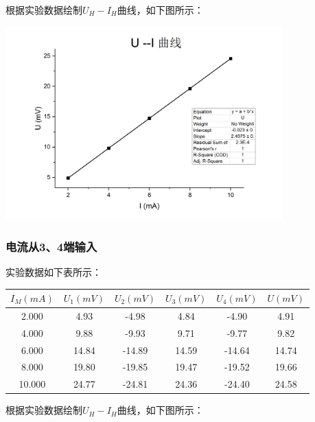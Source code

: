 \documentclass{article}
\begin{document}
    根据实验数据绘制$U_H-I_H$曲线，如下图所示：

    \begin{center}
        \includegraphics[width=0.8\textwidth]{U-I curve.jpg}
    \end{center}

    \subsubsection{电流从3、4端输入}

    实验数据如下表所示：

    \begin{center}
        \begin{tabular}{|c||c|c|c|c||c|}
            \hline
            $I_M(mA)$ & $U_1(mV)$ & $U_2(mV)$ & $U_3(mV)$ & $U_4(mV)$ & $U(mV)$ \\
            \hline
            2.000 & 4.93 & -4.98 & 4.84 & -4.90 & 4.91\\
            \hline
            4.000 & 9.88 & -9.93 & 9.71 & -9.77 & 9.82\\
            \hline
            6.000 & 14.84 & -14.89 & 14.59 & -14.64 & 14.74\\
            \hline
            8.000 &  19.80 & -19.85 & 19.47 & -19.52 & 19.66\\
            \hline
            10.000 & 24.77 & -24.81 & 24.36 & -24.40 & 24.58\\
            \hline
        \end{tabular}        
    \end{center}

    根据实验数据绘制$U_H-I_H$曲线，如下图所示：
\end{document}
